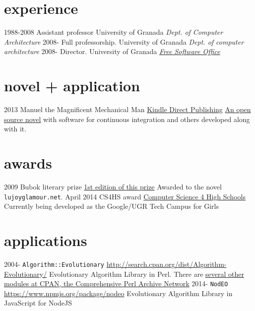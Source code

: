 \documentclass[]{friggeri-jj-cv}
\begin{document}
\section{experience}

\begin{entrylist}
  \entry
    {1988-2008}
    {Assistant professor}
    {University of Granada}
    {\emph{Dept. of Computer Architecture}}
  \entry
    {2008-}
    {Full professorship.}
    {University of Granada}
    {\emph{Dept. of computer architecture}}
    \entry
    {2008-}
    {Director.}
    {University of Granada}
    {\href{http://osl.ugr.es}{\emph{Free Software Office}}}
\end{entrylist}

\section{novel + application}
\begin{entrylist}
  \entry
    {2013}
    {Manuel the Magnificent Mechanical Man}
    {\href{http://www.amazon.com/dp/B00ED084BK/}{Kindle Direct Publishing}}
    {\href{http://jj.github.io/hoborg}{An open source novel} with
        software for continuous integration and others developed along with
      it.}
\end{entrylist}

\section{awards}
\begin{entrylist}
 \entry
    {2009}
    {Bubok literary prize}
    {\href{http://cultura.elpais.com/cultura/2009/05/06/actualidad/1241560804_850215.html}{1st
        edition of this prize}}
    {Awarded to the novel {\tt lujoyglamour.net}.}
 \entry
    {April 2014}
    {CS4HS award}
    {\href{http://cs4hs.com}{Computer Science 4 High Schools}}
    {Currently being developed as the Google/UGR Tech Campus for Girls}
\end{entrylist}


\section{applications}

\begin{entrylist}
  \entry
    {2004-}
    {{\tt Algorithm::Evolutionary}}
    {\href{http://search.cpan.org/dist/Algorithm-Evolutionary/}{http://search.cpan.org/dist/Algorithm-Evolutionary/}}
    {Evolutionary Algorithm Library in Perl. There are
      \href{http://search.cpan.org/~jmerelo/}{several other modules at
      CPAN, the Comprehensive Perl Archive Network}}
  \entry
    {2014-}
    {{\tt NodEO}}
    {\href{https://npmjs.org/package/nodeo}{https://www.npmjs.org/package/nodeo}}
    {Evolutionary Algorithm Library in JavaScript for NodeJS}
\end{entrylist}
\end{document}

